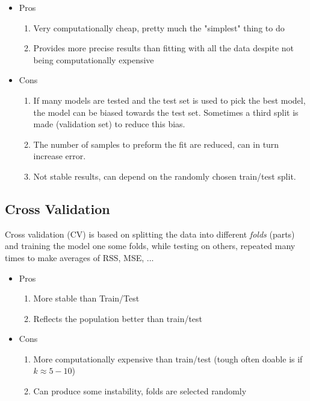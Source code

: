 \documentclass{article}
\begin{document}
\begin{itemize}
    \item Pros 
    \begin{enumerate}
        \item Very computationally cheap, pretty much the "simplest" thing to do
        \item Provides more precise results than fitting with all the data despite not being computationally expensive
    \end{enumerate}
    
    \item Cons
    \begin{enumerate}
        \item If many models are tested and the test set is used to pick the best model, the model can be biased towards the test set. Sometimes a third split is made (validation set) to reduce this bias.
        \item The number of samples to preform the fit are reduced, can in turn increase error.
        \item Not stable results, can depend on the randomly chosen train/test split.
    \end{enumerate}
\end{itemize}

\subsection{Cross Validation}
Cross validation (CV) is based on splitting the data into different \textit{folds} (parts) and training the model one some folds, while testing on others, repeated many times to make averages of RSS, MSE, ... 

\begin{itemize}
    \item Pros
    \begin{enumerate}
        \item More stable than Train/Test
        \item Reflects the population better than train/test
    \end{enumerate}
    
    \item Cons
    \begin{enumerate}
        \item More computationally expensive than train/test (tough often doable is if $k \approx 5-10$)
        \item Can produce some instability, folds are selected randomly 
    \end{enumerate}
\end{itemize}
\end{document}
